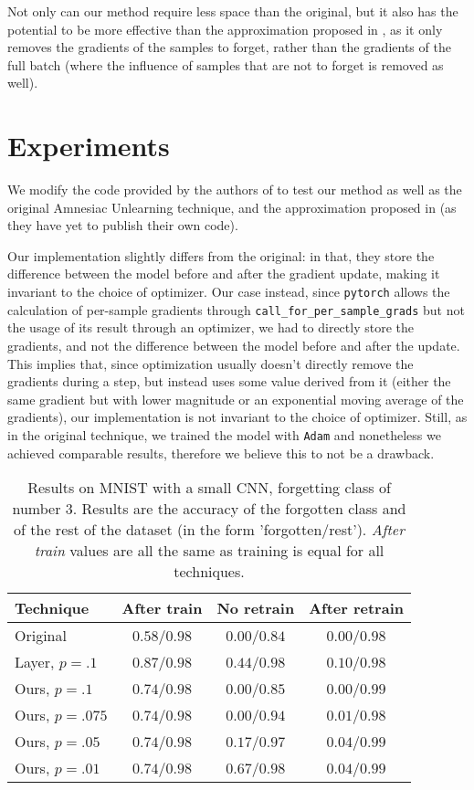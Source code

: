 \documentclass{article}
\begin{document}
Not only can our method require less space than the original, but it also has the potential to be more effective than the approximation proposed in \cite{gogineni2024efficient}, as it only removes the gradients of the samples to forget, rather than the gradients of the full batch (where the influence of samples that are not to forget is removed as well).

\section{Experiments} We modify the code provided by the authors of \cite{graves2021amnesiac} to test our method as well as the original Amnesiac Unlearning technique, and the approximation proposed in \cite{gogineni2024efficient} (as they have yet to publish their own code).

Our implementation slightly differs from the original: in that, they store the difference between the model before and after the gradient update, making it invariant to the choice of optimizer. Our case instead, since \texttt{pytorch} allows the calculation of per-sample gradients through \texttt{call\_for\_per\_sample\_grads} but not the usage of its result through an optimizer, we had to directly store the gradients, and not the difference between the model before and after the update. This implies that, since optimization usually doesn't directly remove the gradients during a step, but instead uses some value derived from it (either the same gradient but with lower magnitude or an exponential moving average of the gradients), our implementation is not invariant to the choice of optimizer. Still, as in the original technique, we trained the model with \texttt{Adam} and nonetheless we achieved comparable results, therefore we believe this to not be a drawback.

\begin{table}
\centering
\caption{Results on MNIST with a small CNN, forgetting class of number $3$. Results are the accuracy of the forgotten class and of the rest of the dataset (in the form 'forgotten/rest'). \emph{After train} values are all the same as training is equal for all techniques.}
\label{tab:mnist_small_cnn}
\begin{tabular}{l | c | c c}
    Technique&After train&No retrain&After retrain\\
    \hline
    Original&$0.58$/$0.98$& $0.00$/$0.84$& $0.00$/$0.98$\\
    Layer, $p=.1$&$0.87$/$0.98$& $0.44$/$0.98$& $0.10$/$0.98$\\
    \hline
    Ours, $p=.1$&$0.74$/$0.98$& $0.00$/$0.85$& $0.00$/$0.99$\\
    Ours, $p=.075$&$0.74$/$0.98$& $0.00$/$0.94$& $0.01$/$0.98$\\
    Ours, $p=.05$&$0.74$/$0.98$& $0.17$/$0.97$& $0.04$/$0.99$\\
    Ours, $p=.01$&$0.74$/$0.98$&$0.67$/$0.98$& $0.04$/$0.99$\\
\end{tabular}
\end{table}
\end{document}
